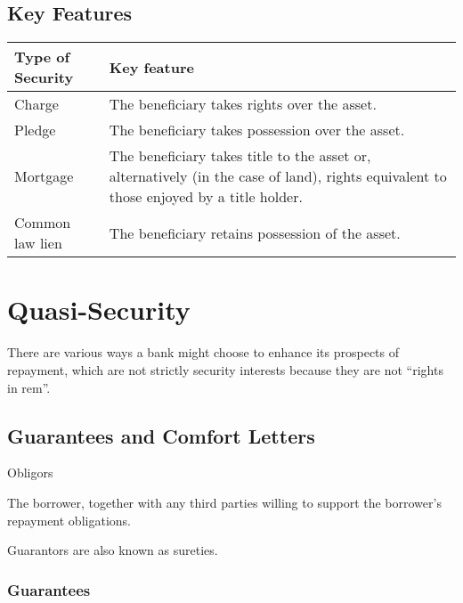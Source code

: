 \documentclass[
]{article}
\newenvironment{env-8872a5c8-2356-4b38-87ff-b8a967f137b3}
{
    \savenotes\tcolorbox[blanker,breakable,left=5pt,borderline west={2pt}{-4pt}{yellow}]
}
{
    \endtcolorbox\spewnotes
}
\begin{document}
\hypertarget{key-features}{%
\subsection{Key Features}\label{key-features}}

\begin{longtable}[]{@{}ll@{}}
\toprule()
Type of Security & Key feature \\
\midrule()
\endhead
Charge & The beneficiary takes rights over the asset. \\
Pledge & The beneficiary takes possession over the asset. \\
Mortgage & The beneficiary takes title to the asset or, alternatively
(in the case of land), rights equivalent to those enjoyed by a title
holder. \\
Common law lien & The beneficiary retains possession of the asset. \\
\bottomrule()
\end{longtable}

\hypertarget{quasi-security}{%
\section{Quasi-Security}\label{quasi-security}}

There are various ways a bank might choose to enhance its prospects of
repayment, which are not strictly security interests because they are
not ``rights in rem''.

\hypertarget{guarantees-and-comfort-letters}{%
\subsection{Guarantees and Comfort
Letters}\label{guarantees-and-comfort-letters}}

\begin{env-8872a5c8-2356-4b38-87ff-b8a967f137b3}

Obligors

The borrower, together with any third parties willing to support the
borrower's repayment obligations.

\end{env-8872a5c8-2356-4b38-87ff-b8a967f137b3}

Guarantors are also known as sureties.

\hypertarget{guarantees}{%
\subsubsection{Guarantees}\label{guarantees}}
\end{document}
